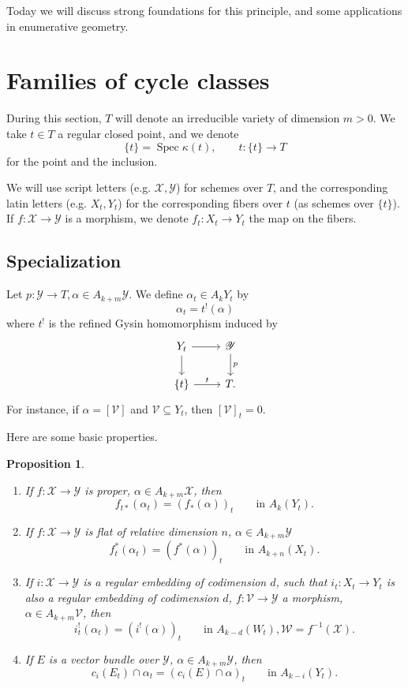 \documentclass[leqno, openany]{memoir}
\newtheorem{prop}[thm]{Proposition}
\theoremstyle{definition}
\theoremstyle{remark}
\theoremstyle{plain}
\theoremstyle{definition}
\theoremstyle{remark}
\newcommand{\msc}[1]{\mathscr{#1}}
\DeclareMathOperator{\Spec}{Spec}
\begin{document}
Today we will discuss strong foundations for this principle, and some applications in enumerative geometry. 

\section{Families of cycle classes}

During this section, $T$ will denote an irreducible variety of dimension $m>0$. We take $t \in T$ a regular closed point, and we denote
\[ \{t\}=\Spec \kappa(t), \qquad t\colon \{t\} \to T \] 
for the point and the inclusion.

We will use script letters (e.g. $\msc{X}, \msc{Y}$) for schemes over $T$, and the corresponding latin letters (e.g. $X_t, Y_t$) for the corresponding fibers over $t$ (as schemes over $\{t\}$). If $f\colon \msc{X} \to \msc{Y}$ is a morphism, we denote $f_t\colon X_t \to Y_t$ the map on the fibers.

\subsection{Specialization}%
\label{sub:specialization}


Let $p\colon \msc{Y} \to T, \alpha \in A_{k+m}\msc{Y}$. We define $\alpha_t \in A_k Y_t$ by
\[ \alpha_t = t^!(\alpha) \]
where $t^{!}$ is the refined Gysin homomorphism induced by
\[ \begin{tikzcd} Y_t \arrow[r] \arrow[d] & \msc{Y} \arrow[d, "p"] \\ {\{t\}} \arrow[r, "t"] & T. \end{tikzcd} \]
For instance, if $\alpha=[\msc{V}]$ and $\msc{V} \subseteq Y_t$, then ${[\msc{V}]}_t=0$. 

Here are some basic properties.
\begin{prop}\label{prop:basicprop}
\begin{enumerate}
\item If $f\colon \msc{X} \to \msc{Y}$ is proper, $\alpha \in A_{k+m}\msc{X}$, then
\[ f_{t\ast}(\alpha_t)={ (f_\ast(\alpha)) }_t \qquad \text{in }A_k(Y_t). \]

\item If $f\colon \msc{X} \to \msc{Y}$ is flat of relative dimension $n$, $\alpha \in A_{k+m}\msc{Y}$
\[ f_t^\ast(\alpha_t)={ (f^\ast(\alpha)) }_t \qquad \text{in }A_{k+n}(X_t). \]

\item If $i\colon \msc{X} \to \msc{Y}$ is a regular embedding of codimension $d$, such that $i_t\colon X_t \to Y_t$ is also a regular embedding of codimension $d$, $f\colon \msc{V} \to \msc{Y}$ a morphism, $\alpha \in A_{k+m}\msc{V}$, then
\[ i_t^!(\alpha_t)={ (i^!(\alpha)) }_t \qquad \text{in } A_{k-d}(W_t), \msc{W}=f^{-1}(\msc{X}). \]
\end{enumerate}
\begin{enumerate} \setcounter{enumi}{3}
\item If $E$ is a vector bundle over $\msc{Y}$, $\alpha \in A_{k+m} \msc{Y}$, then 
\[ c_i(E_t) \cap \alpha_t = { (c_i(E) \cap \alpha) }_t \qquad \text{in }A_{k-i}(Y_t). \]
\end{enumerate}
\end{prop}
\end{document}
